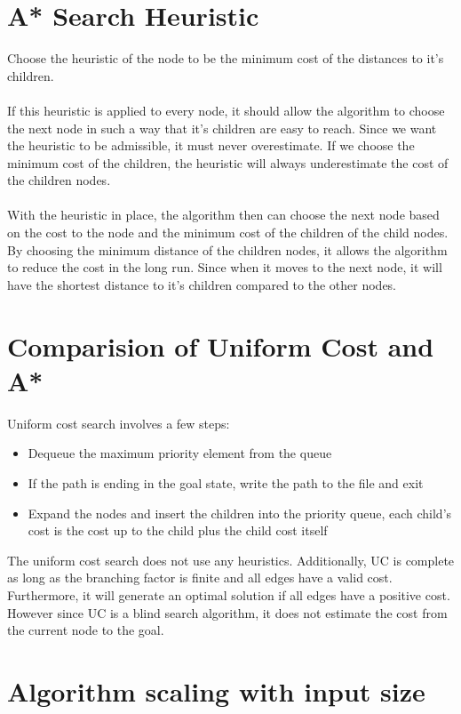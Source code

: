 \documentclass[12pt]{article}
\begin{document}
    \section{A* Search Heuristic}

    Choose the heuristic of the node to be the minimum cost of the distances to it's children.\\
    \\
    If this heuristic is applied to every node, it should allow the algorithm to choose the next node in such a way that it's children are easy to reach. Since we want the heuristic to be admissible, it must never overestimate. If we choose the minimum cost of the children, the heuristic will always underestimate the cost of the children nodes.\\
    \\
    With the heuristic in place, the algorithm then can choose the next node based on the cost to the node and the minimum cost of the children of the child nodes. By choosing the minimum distance of the children nodes, it allows the algorithm to reduce the cost in the long run. Since when it moves to the next node, it will have the shortest distance to it's children compared to the other nodes.

    \section{Comparision of Uniform Cost and A*}

    Uniform cost search involves a few steps:
    \begin{itemize}
        \item Dequeue the maximum priority element from the queue
        \item If the path is ending in the goal state, write the path to the file and exit
        \item Expand the nodes and insert the children into the priority queue, each child's cost is the cost up to the child plus the child cost itself
    \end{itemize}
    The uniform cost search does not use any heuristics. Additionally, UC is complete as long as the branching factor is finite and all edges have a valid cost. Furthermore, it will generate an optimal solution if all edges have a positive cost. However since UC is a blind search algorithm, it does not estimate the cost from the current node to the goal.

    \section{Algorithm scaling with input size}
\end{document}
